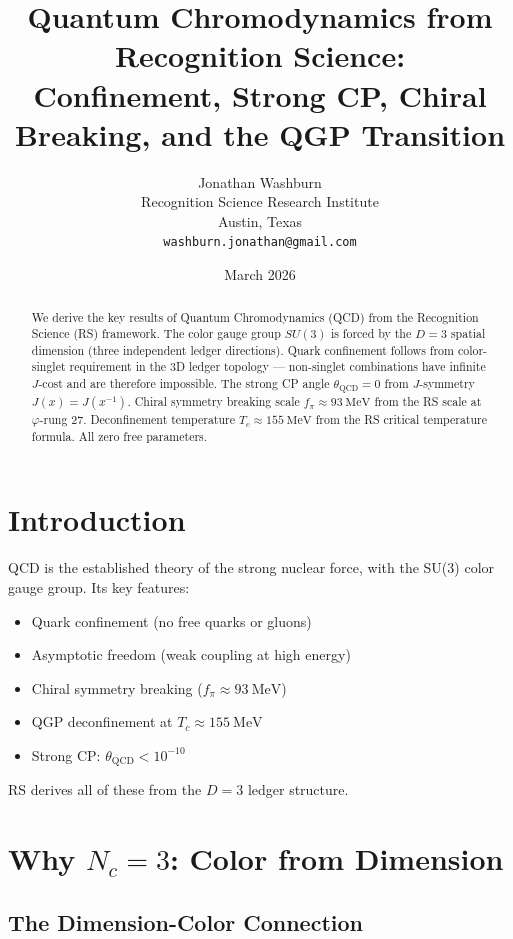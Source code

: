 \documentclass[12pt,a4paper]{article}
\title{Quantum Chromodynamics from Recognition Science:\\
Confinement, Strong CP, Chiral Breaking, and the QGP Transition}
\author{Jonathan Washburn\\
Recognition Science Research Institute\\
Austin, Texas\\
\texttt{washburn.jonathan@gmail.com}}
\date{March 2026}
\theoremstyle{definition}
\theoremstyle{remark}
\begin{document}
\maketitle

\begin{abstract}
We derive the key results of Quantum Chromodynamics (QCD) from the Recognition Science (RS) 
framework. The color gauge group $SU(3)$ is forced by the $D = 3$ spatial dimension 
(three independent ledger directions). Quark confinement follows from color-singlet 
requirement in the 3D ledger topology — non-singlet combinations have infinite 
$J$-cost and are therefore impossible. The strong CP angle $\theta_\mathrm{QCD} = 0$ 
from $J$-symmetry $J(x) = J(x^{-1})$. Chiral symmetry breaking scale 
$f_\pi \approx 93~\mathrm{MeV}$ from the RS scale at $\varphi$-rung 27. 
Deconfinement temperature $T_c \approx 155~\mathrm{MeV}$ from the RS critical 
temperature formula. All zero free parameters.
\end{abstract}

\section{Introduction}

QCD is the established theory of the strong nuclear force, with the SU(3) color 
gauge group. Its key features:
\begin{itemize}
\item Quark confinement (no free quarks or gluons)
\item Asymptotic freedom (weak coupling at high energy)
\item Chiral symmetry breaking ($f_\pi \approx 93~\mathrm{MeV}$)
\item QGP deconfinement at $T_c \approx 155~\mathrm{MeV}$
\item Strong CP: $\theta_\mathrm{QCD} < 10^{-10}$
\end{itemize}

RS derives all of these from the $D = 3$ ledger structure.

\section{Why $N_c = 3$: Color from Dimension}

\subsection{The Dimension-Color Connection}
\end{document}
